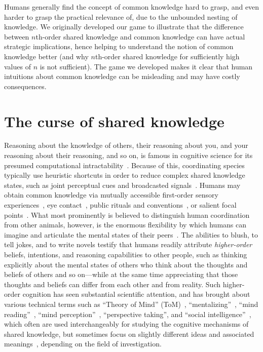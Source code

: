 Humans generally find the concept of common knowledge hard to grasp, and even harder to grasp the practical relevance of, due to the unbounded nesting of knowledge. We originally developed our game to illustrate that the difference between $n$th-order shared knowledge and common knowledge can have actual strategic implications, hence helping to understand the notion of common knowledge better (and why $n$th-order shared knowledge for sufficiently high values of $n$ is not sufficient). The game we developed makes it clear that human intuitions about common knowledge can be misleading and may have costly consequences.

\section{The curse of shared knowledge}
Reasoning about the knowledge of others, their reasoning about you, and your reasoning about their reasoning, and so on, is famous in cognitive science for its presumed computational intractability~\cite{van2018parameterized,bolander2023parameterized}. Because of this, coordinating species typically use heuristic shortcuts in order to reduce complex shared knowledge states, such as joint perceptual cues and broadcasted signals~\cite{milgrom1981axiomatic, clark1996using, bradbury1998principles}. Humans may obtain common knowledge via mutually accessible first-order sensory experiences~\cite{tomasello1995joint, lorini2005establishing, bolander2015announcements, gintis2010rationality}, eye contact~\cite{friedell1969structure}, public rituals and conventions~\cite{lewis1969convention}, or salient focal points~\cite{schelling1957bargaining}. What most prominently is believed to distinguish human coordination from other animals, however, is the enormous flexibility by which humans can imagine and articulate the mental states of their peers~\cite{tooby2010groups, harari2014sapiens}. The abilities to blush, to tell jokes, and to write novels testify that humans readily attribute \textit{higher-order} beliefs, intentions, and reasoning capabilities to other people, such as thinking explicitly about the mental states of others who think about the thoughts and beliefs of others and so on---while at the same time appreciating that those thoughts and beliefs can differ from each other and from reality. Such higher-order cognition has seen substantial scientific attention, and has brought about various technical terms such as ``Theory of Mind'' (ToM)~\cite{premack1978does}, ``mentalizing''~\cite{frith2003development}, ``mind reading''~\cite{vogeley2001mind, apperly2010mindreaders}, %
``mind perception''~\cite{gray2011distortions}, ``perspective taking'', and ``social intelligence''~\cite{baron1999social}, which often are used interchangeably for studying the cognitive mechanisms of shared knowledge, but sometimes focus on slightly different ideas and associated meanings~\cite{schaafsma2015deconstructing}, depending on the field of investigation.

